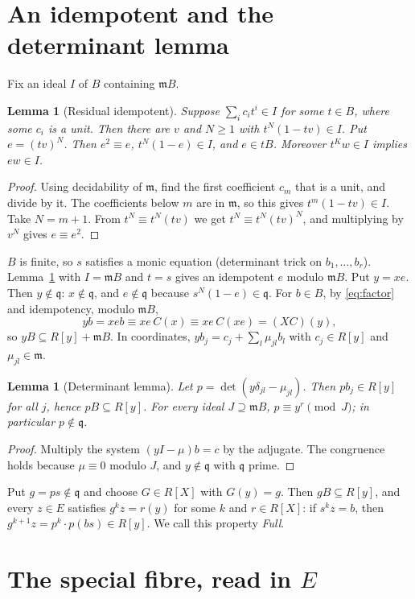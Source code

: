 \documentclass[11pt]{amsart}
\numberwithin{equation}{section}
\newtheorem{lemma}[theorem]{Lemma}
\theoremstyle{definition}
\theoremstyle{remark}
\newcommand{\m}{\mathfrak m}
\newcommand{\q}{\mathfrak q}
\begin{document}
\section{An idempotent and the determinant lemma}

Fix an ideal $I$ of $B$ containing $\m B$.

\begin{lemma}[Residual idempotent]\label{lem:idem}
Suppose $\sum_ic_it^i\in I$ for some $t\in B$, where some $c_i$ is a
unit. Then there are $v$ and $N\ge1$ with $t^N(1-tv)\in I$. Put
$e=(tv)^N$. Then $e^2\equiv e$, $t^N(1-e)\in I$, and $e\in tB$.
Moreover $t^Kw\in I$ implies $ew\in I$.
\end{lemma}
\begin{proof}
Using decidability of $\m$, find the first coefficient $c_m$ that is a
unit, and divide by it. The coefficients below $m$ are in $\m$, so this
gives $t^m(1-tv)\in I$. Take $N=m+1$. From $t^N\equiv t^N(tv)$ we get
$t^N\equiv t^N(tv)^N$, and multiplying by $v^N$ gives $e\equiv e^2$.
\end{proof}

$B$ is finite, so $s$ satisfies a monic equation (determinant trick on
$b_1,\ldots,b_r$). Lemma~\ref{lem:idem} with $I=\m B$ and $t=s$ gives an
idempotent $e$ modulo $\m B$. Put $y=xe$. Then $y\notin\q$: $x\notin\q$,
and $e\notin\q$ because $s^N(1-e)\in\q$. For $b\in B$, by
\eqref{eq:factor} and idempotency, modulo $\m B$,
\[
 yb=xeb\equiv xe\,C(x)\equiv xe\,C(xe)=(XC)(y),
\]
so $yB\subseteq R[y]+\m B$. In coordinates,
$yb_j=c_j+\sum_l\mu_{jl}b_l$ with $c_j\in R[y]$ and $\mu_{jl}\in\m$.

\begin{lemma}[Determinant lemma]\label{lem:det}
Let $p=\det(y\delta_{jl}-\mu_{jl})$. Then $pb_j\in R[y]$ for all $j$,
hence $pB\subseteq R[y]$. For every ideal $J\supseteq\m B$,
$p\equiv y^r\pmod J$; in particular $p\notin\q$.
\end{lemma}
\begin{proof}
Multiply the system $(yI-\mu)b=c$ by the adjugate. The congruence
holds because $\mu\equiv0$ modulo $J$, and $y\notin\q$ with $\q$ prime.
\end{proof}

Put $g=ps\notin\q$ and choose $G\in R[X]$ with $G(y)=g$. Then
$gB\subseteq R[y]$, and every $z\in E$ satisfies $g^{k}z=r(y)$ for some
$k$ and $r\in R[X]$: if $s^kz=b$, then
$g^{k+1}z=p^k\cdot p(bs)\in R[y]$. We call this property \emph{Full}.

\section{The special fibre, read in \texorpdfstring{$E$}{E}}
\end{document}
